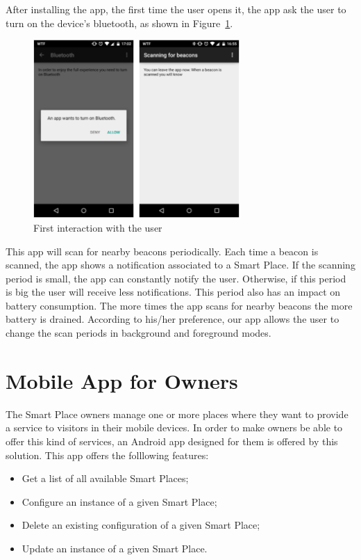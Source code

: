 After installing the app, the first time the user opens it, the app ask the user to turn on the device's bluetooth, as shown in Figure~\ref{fig:screenshot_clientapp_entry}.
\begin{figure}[!ht]
  \centering
    \includegraphics[width=0.7\textwidth, keepaspectratio]{images/screenshots/clientapp_entry}
    \caption[Users mobile app]{First interaction with the user}
    \label{fig:screenshot_clientapp_entry}
\end{figure}
This app will scan for nearby beacons periodically.
Each time a beacon is scanned, the app shows a notification associated to a Smart Place.
If the scanning period is small, the app can constantly notify the user. Otherwise, if this period is big the user will receive less notifications.
This period also has an impact on battery consumption.
The more times the app scans for nearby beacons the more battery is drained.
According to his/her preference, our app allows the user to change the scan periods in background and foreground modes.

\section{Mobile App for Owners}
\label{sec:solution_mobile_app_for_owners}
The Smart Place owners manage one or more places where they want to provide a service to visitors in their mobile devices.
In order to make owners be able to offer this kind of services, an Android app designed for them is offered by this solution.
This app offers the folllowing features:
\begin{itemize}
  \item Get a list of all available Smart Places;
  \item Configure an instance of a given Smart Place;
  \item Delete an existing configuration of a given Smart Place;
  \item Update an instance of a given Smart Place.
\end{itemize}

